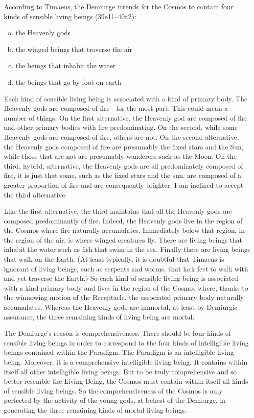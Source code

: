 According to Timaeus, the Demiurge intends for the Cosmos to contain four kinds of sensible living beings (39e11--40a2):
\begin{enumerate}[(a)]
	\item the Heavenly gods
	\item the winged beings that traverse the air
	\item the beings that inhabit the water
	\item the beings that go by foot on earth
\end{enumerate}
Each kind of sensible living being is associated with a kind of primary body. The Heavenly gods are composed of fire---for the most part. This could mean a number of things. On the first alternative, the Heavenly god are composed of fire and other primary bodies with fire predominating. On the second, while some Heavenly gods are composed of fire, others are not. On the second alternative, the Heavenly gods composed of fire are presumably the fixed stars and the Sun, while those that are not are presumably wanderers such as the Moon. On the third, hybrid, alternative, the Heavenly gods are all predominately composed of fire, it is just that some, such as the fixed stars and the sun, are composed of a greater proportion of fire and are consequently brighter. I am inclined to accept the third alternative. 

Like the first alternative, the third maintains that all the Heavenly gods are composed predominantly of fire. Indeed, the Heavenly gods live in the region of the Cosmos where fire naturally accumulates. Immediately below that region, in the region of the air, is where winged creatures fly. There are living beings that inhabit the water such as fish that swim in the sea. Finally there are living beings that walk on the Earth. (At least typically, it is doubtful that Timaeus is ignorant of living beings, such as serpents and worms, that lack feet to walk with and yet traverse the Earth.) So each kind of sensible living being is associated with a kind primary body and lives in the region of the Cosmos where, thanks to the winnowing motion of the Receptacle, the associated primary body naturally accumulates. Whereas the Heavenly gods are immortal, at least by Demiurgic assurance, the three remaining kinds of living being are mortal.

The Demiurge's reason is comprehensiveness. There should be four kinds of sensible living beings in order to correspond to the four kinds of intelligible living beings contained within the Paradigm. The Paradigm is an intelligible living being. Moreover, it is a comprehensive intelligible living being. It contains within itself all other intelligible living beings. But to be truly comprehensive and so better resemble the Living Being, the Cosmos must contain within itself all kinds of sensible living beings. So the comprehensiveness of the Cosmos is only perfected by the activity of the young gods, at behest of the Demiurge, in generating the three remaining kinds of mortal living beings.

